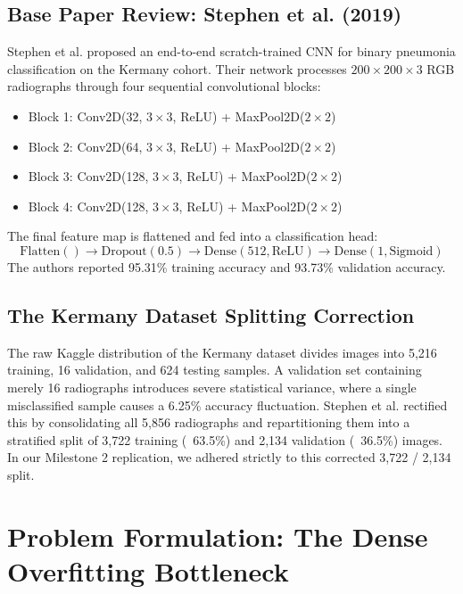 \documentclass[conference]{IEEEtran}
\begin{document}
\subsection{Base Paper Review: Stephen et al. (2019)}
Stephen et al. \cite{b_stephen} proposed an end-to-end scratch-trained CNN for binary pneumonia classification on the Kermany cohort. Their network processes $200 \times 200 \times 3$ RGB radiographs through four sequential convolutional blocks:
\begin{itemize}
    \item Block 1: Conv2D(32, $3\times3$, ReLU) + MaxPool2D($2\times2$)
    \item Block 2: Conv2D(64, $3\times3$, ReLU) + MaxPool2D($2\times2$)
    \item Block 3: Conv2D(128, $3\times3$, ReLU) + MaxPool2D($2\times2$)
    \item Block 4: Conv2D(128, $3\times3$, ReLU) + MaxPool2D($2\times2$)
\end{itemize}
The final feature map is flattened and fed into a classification head:
$$\text{Flatten}() \to \text{Dropout}(0.5) \to \text{Dense}(512, \text{ReLU}) \to \text{Dense}(1, \text{Sigmoid})$$
The authors reported 95.31\% training accuracy and 93.73\% validation accuracy.

\subsection{The Kermany Dataset Splitting Correction}
The raw Kaggle distribution of the Kermany dataset divides images into 5,216 training, 16 validation, and 624 testing samples. A validation set containing merely 16 radiographs introduces severe statistical variance, where a single misclassified sample causes a 6.25\% accuracy fluctuation. Stephen et al. rectified this by consolidating all 5,856 radiographs and repartitioning them into a stratified split of 3,722 training (~63.5\%) and 2,134 validation (~36.5\%) images. In our Milestone 2 replication, we adhered strictly to this corrected 3,722 / 2,134 split.

\section{Problem Formulation: The Dense Overfitting Bottleneck}
\end{document}

